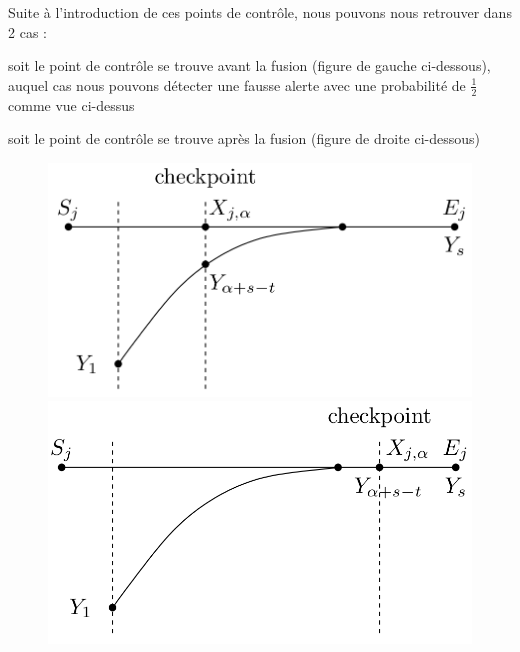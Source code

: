 \begin{samepage}
	Suite à l'introduction de ces points de contrôle, nous pouvons nous retrouver dans 2 cas :
	\bi
		\item soit le point de contrôle se trouve avant la fusion (figure de gauche ci-dessous), auquel cas nous pouvons détecter une fausse alerte avec une probabilité de $\frac{1}{2}$ comme vue ci-dessus
		\item soit le point de contrôle se trouve après la fusion (figure de droite ci-dessous)
	\ei
	\begin{figure}[H]
		\begin{minipage}{.5\textwidth}
			\includegraphics[width=0.9\linewidth]{FalseAlarmDetected.png}
		\end{minipage}
		\begin{minipage}{.5\textwidth}
			\includegraphics[width=0.9\linewidth]{FalseAlarmNotDetected.png}
		\end{minipage}
	\end{figure}
\end{samepage}


